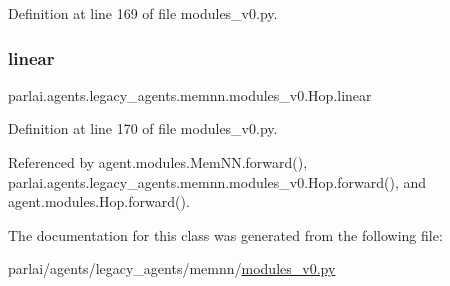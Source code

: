 Definition at line 169 of file modules\+\_\+v0.\+py.

\mbox{\label{classparlai_1_1agents_1_1legacy__agents_1_1memnn_1_1modules__v0_1_1Hop_ac96056089c04bfc0ed7ad4a364655956}} 
\subsubsection{\texorpdfstring{linear}{linear}}
{\footnotesize\ttfamily parlai.\+agents.\+legacy\+\_\+agents.\+memnn.\+modules\+\_\+v0.\+Hop.\+linear}



Definition at line 170 of file modules\+\_\+v0.\+py.



Referenced by agent.\+modules.\+Mem\+N\+N.\+forward(), parlai.\+agents.\+legacy\+\_\+agents.\+memnn.\+modules\+\_\+v0.\+Hop.\+forward(), and agent.\+modules.\+Hop.\+forward().



The documentation for this class was generated from the following file\+:\begin{DoxyCompactItemize}
\item 
parlai/agents/legacy\+\_\+agents/memnn/\hyperlink{memnn_2modules__v0_8py}{modules\+\_\+v0.\+py}\end{DoxyCompactItemize}
